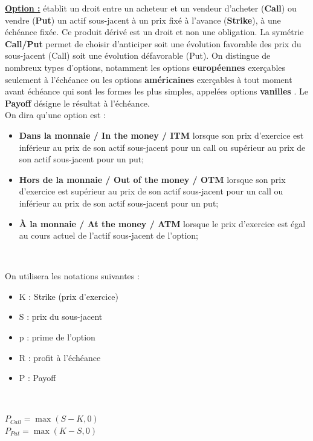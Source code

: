 \underline{\textbf{Option :}} établit un droit entre un acheteur et un vendeur d'acheter (\textbf{Call}) ou vendre (\textbf{Put}) un actif sous-jacent à un prix fixé à l'avance (\textbf{Strike}), à une échéance fixée. Ce produit dérivé est un droit et non une obligation. La symétrie \textbf{Call/Put} permet de choisir d'anticiper soit une évolution favorable des prix du sous-jacent (Call) soit une évolution défavorable (Put). On distingue de nombreux types d'options, notamment les options \textbf{européennes} exerçables seulement à l'échéance ou les options \textbf{américaines} exerçables à tout moment avant échéance qui sont les formes les plus simples, appelées options \textbf{vanilles} \cite{Option}.
Le \textbf{Payoff} désigne le résultat à l'échéance. \\
On dira qu'une option est :
\begin{itemize}
    \item \textbf{Dans la monnaie / In the money / ITM} lorsque son prix d'exercice est inférieur au prix de son actif sous-jacent pour un call ou supérieur au prix de son actif sous-jacent pour un put;
    \item \textbf{Hors de la monnaie / Out of the money / OTM} lorsque son prix d'exercice est supérieur au prix de son actif sous-jacent pour un call ou inférieur au prix de son actif sous-jacent pour un put;
    \item \textbf{À la monnaie / At the money / ATM} lorsque le prix d'exercice est égal au cours actuel de l'actif sous-jacent de l'option;
\end{itemize} ~\

On utilisera les notations suivantes : \\
\begin{itemize}
    \item K : Strike (prix d'exercice)
    \item S : prix du sous-jacent
    \item p : prime de l'option
    \item R : profit à l'échéance
    \item P : Payoff
\end{itemize}
~\\
\begin{definitionbox}[frametitle = {Formules du Payoff}]
\begin{center}
    $P_{Call} = \max(S-K,0)$ \\
    $P_{Put} = \max(K-S,0)$
\end{center}

\end{definitionbox}

